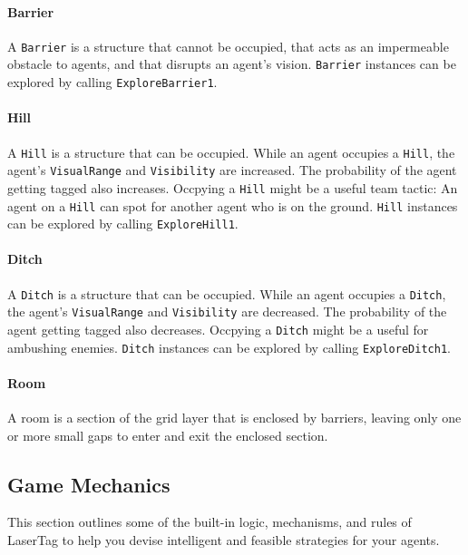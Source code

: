 \documentclass[
    a4paper,
    english,
    DIV=16,
    11pt,
    parskip=half,
    listof=totoc,		%
    index=totoc,		%
    bibliography=totoc,	%
]{scrartcl}
\begin{document}
\paragraph{Barrier}
A \texttt{Barrier} is a structure that cannot be occupied, that acts as an impermeable obstacle to agents, and that disrupts an agent's vision. \texttt{Barrier} instances can be explored by calling \texttt{ExploreBarrier1}.

\paragraph{Hill} \label{hillDesc}
A \texttt{Hill} is a structure that can be occupied. While an agent occupies a \texttt{Hill}, the agent's \texttt{VisualRange} and \texttt{Visibility} are increased. The probability of the agent getting tagged also increases. Occpying a \texttt{Hill} might be a useful team tactic: An agent on a \texttt{Hill} can spot for another agent who is on the ground. \texttt{Hill} instances can be explored by calling \texttt{ExploreHill1}.

\paragraph{Ditch} \label{ditchDesc}
A \texttt{Ditch} is a structure that can be occupied. While an agent occupies a \texttt{Ditch}, the agent's \texttt{VisualRange} and \texttt{Visibility} are decreased. The probability of the agent getting tagged also decreases. Occpying a \texttt{Ditch} might be a useful for ambushing enemies. \texttt{Ditch} instances can be explored by calling \texttt{ExploreDitch1}.

\paragraph{Room}
A room is a section of the grid layer that is enclosed by barriers, leaving only one or more small gaps to enter and exit the enclosed section.

\subsection{Game Mechanics} \label{gameMechs}
This section outlines some of the built-in logic, mechanisms, and rules of LaserTag to help you devise intelligent and feasible strategies for your agents.
\end{document}
